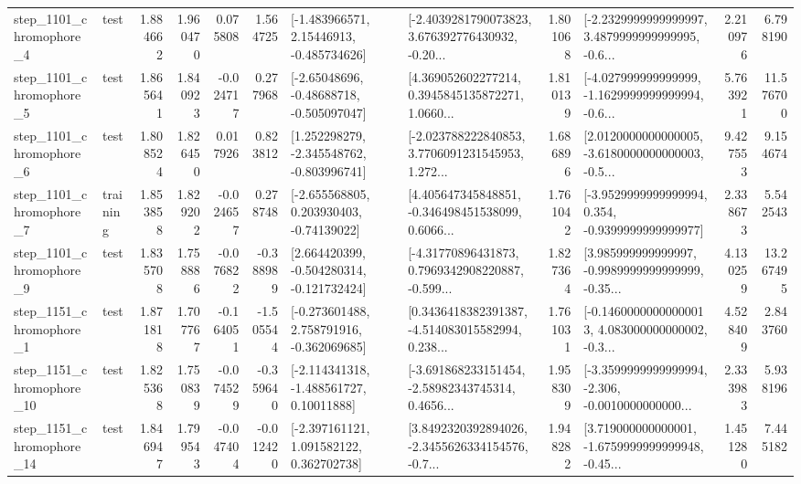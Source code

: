 \begin{tabular}{llrrrrllrlrr}
  step\_1101\_chromophore\_4 &      test &      1.884662 &    1.960470 &      0.075808 &  1.564725 &    [-1.483966571, 2.15446913, -0.485734626] &  [-2.4039281790073823, 3.676392776430932, -0.20... &       1.801068 &  [-2.2329999999999997, 3.4879999999999995, -0.6... &            2.210976 &          6.798190 \\
  step\_1101\_chromophore\_5 &      test &      1.865641 &    1.840923 &     -0.024717 &  0.277968 &    [-2.65048696, -0.48688718, -0.505097047] &  [4.369052602277214, 0.3945845135872271, 1.0660... &       1.810139 &  [-4.027999999999999, -1.1629999999999994, -0.6... &            5.763921 &         11.576700 \\
  step\_1101\_chromophore\_6 &      test &      1.808524 &    1.826450 &      0.017926 &  0.823812 &   [1.252298279, -2.345548762, -0.803996741] &  [-2.023788222840853, 3.7706091231545953, 1.272... &       1.686896 &  [2.0120000000000005, -3.6180000000000003, -0.5... &            9.427553 &          9.154674 \\
  step\_1101\_chromophore\_7 &  training &      1.853858 &    1.829202 &     -0.024657 &  0.278748 &    [-2.655568805, 0.203930403, -0.74139022] &  [4.405647345848851, -0.346498451538099, 0.6066... &       1.761042 &  [-3.9529999999999994, 0.354, -0.9399999999999977] &            2.338673 &          5.542543 \\
  step\_1101\_chromophore\_9 &      test &      1.835708 &    1.758886 &     -0.076822 & -0.388989 &   [2.664420399, -0.504280314, -0.121732424] &  [-4.31770896431873, 0.7969342908220887, -0.599... &       1.827364 &  [3.985999999999997, -0.9989999999999999, -0.35... &            4.130259 &         13.267495 \\
  step\_1151\_chromophore\_1 &      test &      1.871818 &    1.707767 &     -0.164051 & -1.505544 &   [-0.273601488, 2.758791916, -0.362069685] &  [0.3436418382391387, -4.514083015582994, 0.238... &       1.761031 &  [-0.14600000000000013, 4.083000000000002, -0.3... &            4.528409 &          2.843760 \\
 step\_1151\_chromophore\_10 &      test &      1.825368 &    1.750839 &     -0.074529 & -0.359640 &    [-2.114341318, -1.488561727, 0.10011888] &  [-3.691868233151454, -2.58982343745314, 0.4656... &       1.958309 &  [-3.3599999999999994, -2.306, -0.0010000000000... &            2.333983 &          5.938196 \\
 step\_1151\_chromophore\_14 &      test &      1.846947 &    1.799543 &     -0.047404 & -0.012420 &    [-2.397161121, 1.091582122, 0.362702738] &  [3.8492320392894026, -2.3455626334154576, -0.7... &       1.948282 &  [3.719000000000001, -1.6759999999999948, -0.45... &            1.451280 &          7.445182 \\

\end{tabular}
